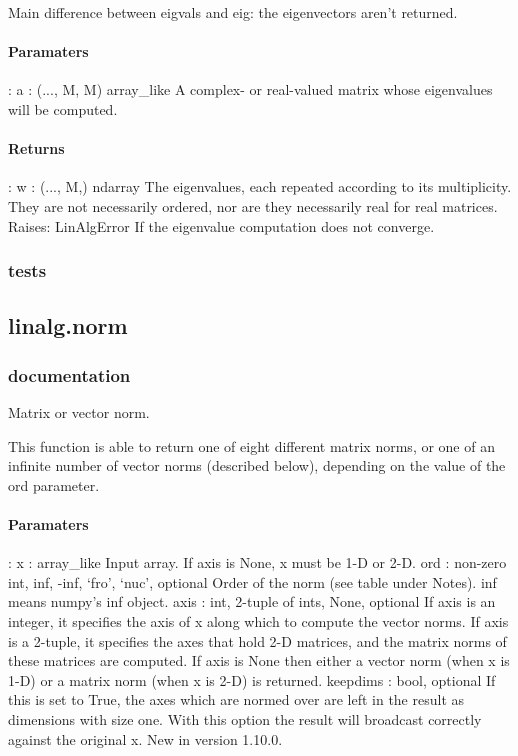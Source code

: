 \documentclass[a4paper,11pt]{article}
\begin{document}
Main difference between eigvals and eig: the eigenvectors aren’t returned.


\paragraph{Paramaters}: 
a : (..., M, M) array\_like
A complex- or real-valued matrix whose eigenvalues will be computed.\\
\paragraph{Returns}:    
w : (..., M,) ndarray
The eigenvalues, each repeated according to its multiplicity. They are not necessarily ordered, nor are they necessarily real for real matrices.\\
Raises: 
LinAlgError
If the eigenvalue computation does not converge.\\
\subsubsection{tests}
\subsection{linalg.norm}
\subsubsection{documentation}
Matrix or vector norm.

This function is able to return one of eight different matrix norms, or one of an infinite number of vector norms (described below), depending on the value of the ord parameter.\\

\paragraph{Paramaters}: 
x : array\_like
Input array. If axis is None, x must be 1-D or 2-D.
ord : {non-zero int, inf, -inf, ‘fro’, ‘nuc’}, optional
Order of the norm (see table under Notes). inf means numpy’s inf object.
axis : {int, 2-tuple of ints, None}, optional
If axis is an integer, it specifies the axis of x along which to compute the vector norms. If axis is a 2-tuple, it specifies the axes that hold 2-D matrices, and the matrix norms of these matrices are computed. If axis is None then either a vector norm (when x is 1-D) or a matrix norm (when x is 2-D) is returned.
keepdims : bool, optional
If this is set to True, the axes which are normed over are left in the result as dimensions with size one. With this option the result will broadcast correctly against the original x.
New in version 1.10.0.\\
\end{document}
